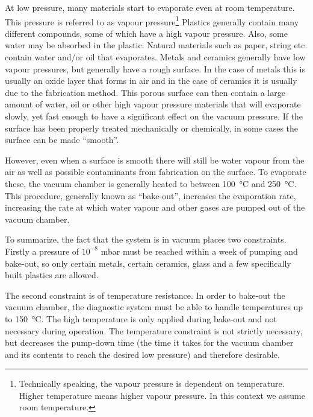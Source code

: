 At low pressure, many materials start to evaporate even at room temperature. This pressure is referred to as vapour pressure\footnote{Technically speaking, the vapour pressure is dependent on temperature. Higher temperature means higher vapour pressure. In this context we assume room temperature.}
Plastics generally contain many different compounds, some of which have a high vapour pressure. Also, some water may be absorbed in the plastic.
Natural materials such as paper, string etc. contain water and/or oil that evaporates.
Metals and ceramics generally have low vapour pressures, but generally have a rough surface. In the case of metals this is usually an oxide layer that forms in air and in the case of ceramics it is usually due to the fabrication method.  This porous surface can then contain a large amount of water, oil or other high vapour pressure materials that will evaporate slowly, yet fast enough to have a significant effect on the vacuum pressure. If the surface has been properly treated mechanically or chemically, in some cases the surface can be made ``smooth''.

However, even when a surface is smooth there will still be water vapour from the air as well as possible contaminants from fabrication on the surface. 
To evaporate these, the vacuum chamber is generally heated to between \SI{100}{\degreeCelsius} and \SI{250}{\degreeCelsius}. This procedure, generally known as ``bake-out'', increases the evaporation rate, increasing the rate at which water vapour and other gases are pumped out of the vacuum chamber.

To summarize, the fact that the system is in vacuum places two constraints. Firstly a pressure of $10^{-8}$ mbar must be reached within a week of pumping and bake-out, so only certain metals, certain ceramics, glass and a few specifically built plastics are allowed. 

The second constraint is of temperature resistance. In order to bake-out the vacuum chamber, the diagnostic system must be able to handle temperatures up to \SI{150}{\degreeCelsius}. The high temperature is only applied during bake-out and not necessary during operation.
The temperature constraint is not strictly necessary, but decreases the pump-down time (the time it takes for the vacuum chamber and its contents to reach the desired low pressure) and therefore desirable. 

